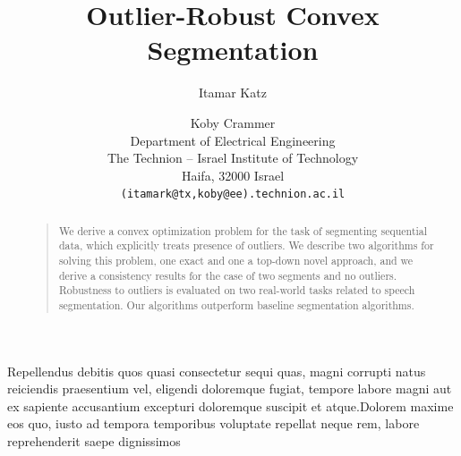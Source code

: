 \documentclass[letterpaper]{article}
\title{Outlier-Robust Convex Segmentation}
\author{
Itamar Katz \and Koby Crammer\\
Department of Electrical Engineering\\
The Technion -- Israel Institute of Technology\\
Haifa, 32000 Israel\\
\texttt{(itamark@tx,koby@ee).technion.ac.il}
}
\begin{document}
\maketitle
\begin{abstract}
\begin{quote}
We derive a convex optimization problem for the task of segmenting sequential data, which
explicitly treats presence of outliers.
We describe two algorithms for solving this
problem, one exact and one a top-down novel approach,
and we derive a consistency results for the case of two segments and no outliers.
Robustness to outliers is evaluated on
two real-world tasks related to speech segmentation.
Our algorithms outperform baseline segmentation algorithms.
\end{quote}
\end{abstract}







Repellendus debitis quos quasi consectetur sequi quas, magni corrupti natus reiciendis praesentium vel, eligendi doloremque fugiat, tempore labore magni aut ex sapiente accusantium excepturi doloremque suscipit et atque.Dolorem maxime eos quo, iusto ad tempora temporibus voluptate repellat neque rem, labore reprehenderit saepe dignissimos


\end{document}
